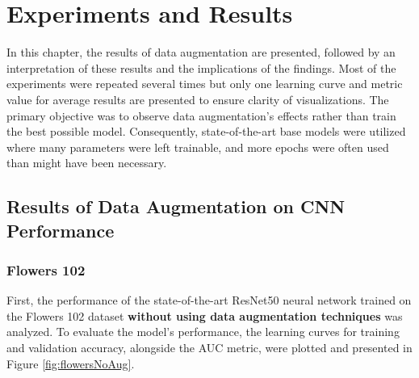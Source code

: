 \chapter{Experiments and Results}
\label{cha:ExperimentalSetup}

In this chapter, the results of data augmentation are presented, followed by an interpretation of these results and the implications of the findings. Most of the experiments were repeated several times but only one learning curve and metric value for average results are presented to ensure clarity of visualizations. The primary objective was to observe data augmentation's effects rather than train the best possible model. Consequently, state-of-the-art base models were utilized where many parameters were left trainable, and more epochs were often used than might have been necessary.

\section{Results of Data Augmentation on CNN Performance}
\label{sec:results}

\subsection{Flowers 102}
\label{ssec:resultsFlowers}

First, the performance of the state-of-the-art ResNet50 neural network trained on the Flowers 102 dataset \textbf{without using data augmentation techniques} was analyzed. To evaluate the model's performance, the learning curves for training and validation accuracy, alongside the AUC metric, were plotted and presented in Figure \ref{fig:flowersNoAug}.


